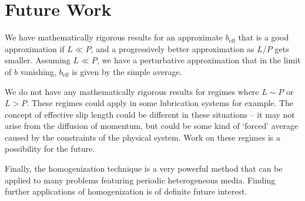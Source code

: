 \documentclass[12pt, a4paper, twoside, openright]{book}
\newcommand{\beff}{\ensuremath{b_{\mathrm{eff}}}}
\newcommand{\bmin}{\ensuremath{b_{\mathrm{min}}}}
\newcommand{\bmax}{\ensuremath{b_{\mathrm{max}}}}
\begin{document}


\section{Future Work}

We have mathematically rigorous results for an approximate $\beff$ that is a good approximation if $L \ll P$, and a progressively better approximation as $L/P$ gets smaller.  Assuming $L \ll P$, we have a perturbative approximation that in the limit of $b$ vanishing, $\beff$ is given by the simple average.

We do not have any mathematically rigorous results for regimes where $L \sim P$ or $L > P$.  These regimes could apply in some lubrication systems for example. The concept of effective slip length could be different in these situations -- it may not arise from the diffusion of momentum, but could be some kind of `forced' average caused by the constraints of the physical system.  Work on these regimes is a possibility for the future.



Finally, the homogenization technique is a very powerful method that can be applied to many problems featuring periodic heterogeneous media.  Finding further applications of homogenization is of definite future interest.


\end{document}
